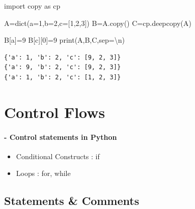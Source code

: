 \documentclass[
  letterpaper,
  DIV=11,
  numbers=noendperiod]{scrreprt}
\newenvironment{Shaded}{\begin{snugshade}}{\end{snugshade}}
\newcommand{\BuiltInTok}[1]{\textcolor[rgb]{0.00,0.23,0.31}{#1}}
\newcommand{\CharTok}[1]{\textcolor[rgb]{0.13,0.47,0.30}{#1}}
\newcommand{\DecValTok}[1]{\textcolor[rgb]{0.68,0.00,0.00}{#1}}
\newcommand{\ImportTok}[1]{\textcolor[rgb]{0.00,0.46,0.62}{#1}}
\newcommand{\NormalTok}[1]{\textcolor[rgb]{0.00,0.23,0.31}{#1}}
\newcommand{\OperatorTok}[1]{\textcolor[rgb]{0.37,0.37,0.37}{#1}}
\newcommand{\StringTok}[1]{\textcolor[rgb]{0.13,0.47,0.30}{#1}}
\providecommand{\tightlist}{%
  \setlength{\itemsep}{0pt}\setlength{\parskip}{0pt}}\usepackage{longtable,booktabs,array}
\begin{document}
\begin{Shaded}
\begin{Highlighting}[]
\ImportTok{import}\NormalTok{ copy }\ImportTok{as}\NormalTok{ cp}
\end{Highlighting}
\end{Shaded}

\begin{Shaded}
\begin{Highlighting}[]
\NormalTok{A}\OperatorTok{=}\BuiltInTok{dict}\NormalTok{(a}\OperatorTok{=}\DecValTok{1}\NormalTok{,b}\OperatorTok{=}\DecValTok{2}\NormalTok{,c}\OperatorTok{=}\NormalTok{[}\DecValTok{1}\NormalTok{,}\DecValTok{2}\NormalTok{,}\DecValTok{3}\NormalTok{])}
\NormalTok{B}\OperatorTok{=}\NormalTok{A.copy()}
\NormalTok{C}\OperatorTok{=}\NormalTok{cp.deepcopy(A)}

\NormalTok{B[}\StringTok{\textquotesingle{}a\textquotesingle{}}\NormalTok{]}\OperatorTok{=}\DecValTok{9}
\NormalTok{B[}\StringTok{\textquotesingle{}c\textquotesingle{}}\NormalTok{][}\DecValTok{0}\NormalTok{]}\OperatorTok{=}\DecValTok{9}
\BuiltInTok{print}\NormalTok{(A,B,C,sep}\OperatorTok{=}\StringTok{\textquotesingle{}}\CharTok{\textbackslash{}n}\StringTok{\textquotesingle{}}\NormalTok{)}
\end{Highlighting}
\end{Shaded}

\begin{verbatim}
{'a': 1, 'b': 2, 'c': [9, 2, 3]}
{'a': 9, 'b': 2, 'c': [9, 2, 3]}
{'a': 1, 'b': 2, 'c': [1, 2, 3]}
\end{verbatim}

\chapter{Control Flows}\label{control-flows}

\subsubsection{- Control statements in
Python}\label{control-statements-in-python}

\begin{itemize}
\tightlist
\item
  Conditional Constructs : if
\item
  Loops : for, while
\end{itemize}

\section{Statements \& Comments}\label{statements-comments}
\end{document}
